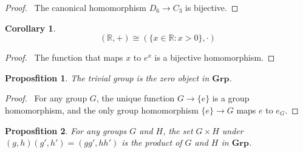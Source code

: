 \documentclass{book}
\let\qed\relax
\newtheorem{prop}{Proposfition}[chapter]
\newtheorem{cor}{Corollary}[prop]
\theoremstyle{definition}
\begin{document}
\begin{proof}
    \pf\ The canonical homomorphism $D_6 \rightarrow C_3$ is bijective. \qed
\end{proof}

\begin{cor}
    \[ (\mathbb{R}, +) \cong (\{ x \in \mathbb{R} : x > 0 \}, \cdot) \]
\end{cor}

\begin{proof}
    \pf\ The function that maps $x$ to $e^x$ is a bijective homomorphism. \qed
\end{proof}

\begin{prop}
    The trivial group is the zero object in $\mathbf{Grp}$.
\end{prop}

\begin{proof}
    \pf\ For any group $G$, the unique function $G \rightarrow \{e\}$ is a group homomorphism, and the only group homomorphism $\{e\} \rightarrow G$ maps $e$ to $e_G$. \qed
\end{proof}

\begin{prop}
    For any groups $G$ and $H$, the set $G \times H$ under $(g,h)(g',h') = (gg',hh')$ is the product of $G$ and $H$ in $\mathbf{Grp}$.
\end{prop}
\end{document}
